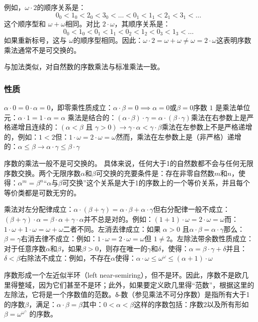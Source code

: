 例如，\(\omega \cdot 2\)的顺序关系是：
\[
0_0 < 1_0 < 2_0 < 3_0 < \dots < 0_1 < 1_1 < 2_1 < 3_1 < \dots~
\]
这个顺序型和 \(\omega + \omega\)相同。对比 \(2 \cdot \omega\)，其顺序关系是：
\[
0_0 < 1_0 < 0_1 < 1_1 < 0_2 < 1_2 < 0_3 < 1_3 < \dots~
\]
如果重新标号，这与 \(\omega\)的顺序型相同。因此：\(\omega \cdot 2 =\omega + \omega \neq \omega = 2 \cdot \omega\)这表明序数乘法通常不是可交换的。  

与加法类似，对自然数的序数乘法与标准乘法一致。
\subsubsection{性质}  
\(\alpha \cdot 0 = 0 \cdot \alpha = 0\)，即零乘性质成立：\(\alpha \cdot \beta = 0 \implies \alpha = 0 \text{或} \beta = 0\)序数 \(1\) 是乘法单位元：\(\alpha \cdot 1 = 1 \cdot \alpha = \alpha\)
乘法是结合的：\((\alpha \cdot \beta) \cdot \gamma = \alpha \cdot (\beta \cdot \gamma)\)乘法在右参数上是严格递增且连续的：\((\alpha < \beta \text{ 且 } \gamma > 0 )\to \gamma \cdot \alpha < \gamma \cdot \beta\)乘法在左参数上不是严格递增的，例如：\(1 < 2\)但：\(1 \cdot \omega = 2 \cdot \omega = \omega\)然而，乘法在左参数上是（非严格）递增的：\(\alpha \leq \beta \to \alpha \cdot \gamma \leq \beta \cdot \gamma\)

序数的乘法一般不是可交换的。  具体来说，任何大于1的自然数都不会与任何无限序数交换。两个无限序数\(\alpha\)和\(\beta\)可交换的充要条件是：存在非零自然数\(m\)和\(n\)，使得：\(\alpha^m = \beta^n\)“\(\alpha\)与\(\beta\)可交换”这个关系是大于1的序数上的一个等价关系，并且每个等价类都是可数无穷的。

乘法对左分配律成立：\(\alpha \cdot (\beta+\gamma)=\alpha\cdot \beta+\alpha \cdot \gamma\)但右分配律一般不成立：\((\beta + \gamma) \cdot \alpha = \beta \cdot \alpha+\gamma \cdot \alpha\)并不总是对的。例如：\((1+1)\cdot \omega=2\cdot\omega = \omega\)而：\(1\cdot\omega+1\cdot \omega=\omega+\omega\)二者不同。左消去律成立：如果 \(\alpha > 0\) 且\(\alpha \cdot \beta = \alpha \cdot \gamma\)那么：\(\beta =\gamma\)右消去律不成立：例如：\(1\cdot \omega = 2\cdot\omega = \omega\)但 \(1 \neq 2\)。左除法带余数性质成立：对于任意序数\(\alpha\)和\(\beta\)，如果\(\beta > 0\)，则存在唯一的\(\gamma\)和\(\delta\)，使得：\(\alpha=\beta \cdot\gamma +\delta\)并且：\(\delta < \beta\)右除法不成立：例如，不存在\(\alpha\)使得：\(\alpha\cdot\omega \leq \omega^\omega\leq (\alpha + 1)\cdot\omega\)

序数形成一个左近似半环（left near-semiring），但不是环。因此，序数不是欧几里得整域，因为它们甚至不是环；此外，如果要定义欧几里得“范数”，根据这里的左除法，它将是一个序数值的范数。δ-数（参见乘法不可分序数）是指所有大于1的序数\(\beta\)，满足：\(\alpha \cdot \beta = \beta\)其中：\(0 < \alpha < \beta\)这样的序数包括：序数\(2\)以及所有形如\(\beta = \omega^{\omega^\gamma}\) 的序数。
